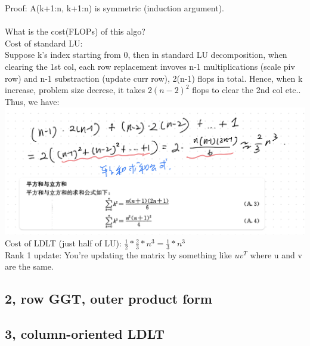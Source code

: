 \documentclass{article}
\begin{document}
\noindent
Proof: A(k+1:n, k+1:n) is symmetric (induction argument).\\
\\
\noindent
What is the cost(FLOPs) of this algo?\\
Cost of standard LU:\\
Suppose k's index starting from 0, then in standard LU decomposition, when clearing
the 1st col, each row replacement invoves n-1 multiplications (scale piv row) and n-1 substraction (update
curr row), 2(n-1) flops in total. Hence, when k increase, problem size decrese, it takes $2(n-2)^2$ flops
to clear the 2nd col etc.. Thus, we have:\\
\includegraphics[width=1\linewidth]{lec6-6}\\

\noindent
Cost of LDLT (just half of LU): $\frac{1}{2} * \frac{2}{3}*n^3 = \frac{1}{3}*n^3$\\


\noindent
Rank 1 update: You're updating the matrix by something like $uv^T$ where u and v are the same.\\

\noindent
\subsection*{2, row GGT, outer product form}

\noindent
\subsection*{3, column-oriented LDLT}
\end{document}
